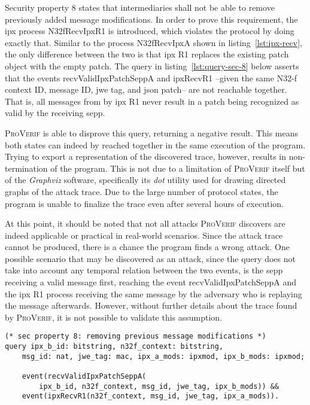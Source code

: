 Security property 8 states that intermediaries shall not be able to remove previously added message modifications.
In order to prove this requirement, the \gls{ipx} process {\sffamily N32fRecvIpxR1} is introduced, which violates the protocol by doing exactly that.
Similar to the process {\sffamily N32fRecvIpxA} shown in listing~\ref{lst:ipx-recv}, the only difference between the two is that \gls{ipx} R1 replaces the existing patch object with the empty patch.
The query in listing~\ref{lst:query-sec-8} below asserts that the events {\sffamily recvValidIpxPatchSeppA} and {\sffamily ipxRecvR1} --given the same N32-f context ID, message ID, \gls{jwe} tag, and \gls{json} patch-- are not reachable together.
That is, all messages from by \gls{ipx} R1 never result in a patch being recognized as valid by the receiving \gls{sepp}.

\textsc{ProVerif} is able to disprove this query, returning a negative result.
This means both states can indeed by reached together in the same execution of the program.
Trying to export a representation of the discovered trace, however, results in non-termination of the program.
This is not due to a limitation of \textsc{ProVerif} itself but of the \textit{Graphviz} software, specifically its \textit{dot} utility used for drawing directed graphs of the attack trace.
Due to the large number of protocol states, the program is unable to finalize the trace even after several hours of execution.

At this point, it should be noted that not all attacks \textsc{ProVerif} discovers are indeed applicable or practical in real-world scenarios.
Since the attack trace cannot be produced, there is a chance the program finds a wrong attack.
One possible scenario that may be discovered as an attack, since the query does not take into account any temporal relation between the two events, is the \gls{sepp} receiving a valid message first, reaching the event {\sffamily recvValidIpxPatchSeppA} and the \gls{ipx} R1 process receiving the same message by the adversary who is replaying the message afterwards.
However, without further details about the trace found by \textsc{ProVerif}, it is not possible to validate this assumption.

\begin{lstlisting}[caption={Query for security property 8},label={lst:query-sec-8},firstnumber=359]
(* sec property 8: removing previous message modifications *)
query ipx_b_id: bitstring, n32f_context: bitstring,
    msg_id: nat, jwe_tag: mac, ipx_a_mods: ipxmod, ipx_b_mods: ipxmod;

    event(recvValidIpxPatchSeppA(
        ipx_b_id, n32f_context, msg_id, jwe_tag, ipx_b_mods)) &&
    event(ipxRecvR1(n32f_context, msg_id, jwe_tag, ipx_a_mods)).
\end{lstlisting}

